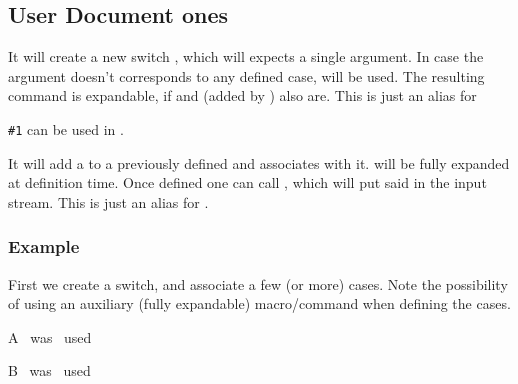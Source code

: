 \documentclass[10pt]{article}
\begin{document}
\subsection{User Document ones}
\begin{codedescribe}{\newswitch}
\begin{codesyntax}%
\tsobj{\newswitch}  
\end{codesyntax}
It will create a new switch , which will expects a single argument. In case the argument doesn't corresponds to any defined case,  will be used. The resulting  command is expandable, if  and  (added by \tsobj{\addcase}) also are. This is just an alias for 
\end{codedescribe}
\begin{tsremark}
  \verb|#1| can be used in .
\end{tsremark}

\begin{codedescribe}{\addcase}
\begin{codesyntax}%
\tsobj{\addcase}  
\end{codesyntax}
It will add a  to a previously defined  and associates  with it.  will be fully expanded at definition time. Once defined one can call , which will put said  in the input stream.   This is just an alias for .
\end{codedescribe}

\subsubsection{Example}

First we create a switch, and associate a few (or more) cases. Note the possibility of using an auxiliary (fully expandable) macro/command when defining the cases.
\begin{codestore}[switch02]
\def\CaseAstring{case-A}
\newswitch {}
\addcase  \myCase  {\CaseAstring} {A~ was~ used\par}
\addcase  {} {B~ was~ used\par}
\end{codestore}
\end{document}
